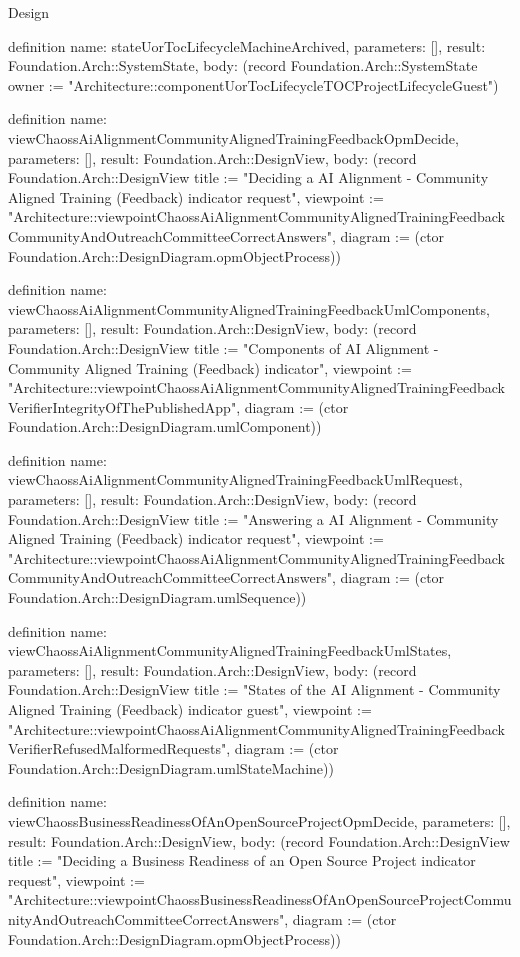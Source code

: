 \begin{lexlean}{Design}
\begin{semanticmodule}
definition{
  name: stateUorTocLifecycleMachineArchived,
  parameters: [],
  result: Foundation.Arch::SystemState,
  body: (record Foundation.Arch::SystemState {owner := "Architecture::componentUorTocLifecycleTOCProjectLifecycleGuest"})
}

definition{
  name: viewChaossAiAlignmentCommunityAlignedTrainingFeedbackOpmDecide,
  parameters: [],
  result: Foundation.Arch::DesignView,
  body: (record Foundation.Arch::DesignView {title := "Deciding a AI Alignment - Community Aligned Training (Feedback) indicator request", viewpoint := "Architecture::viewpointChaossAiAlignmentCommunityAlignedTrainingFeedbackCommunityAndOutreachCommitteeCorrectAnswers", diagram := (ctor Foundation.Arch::DesignDiagram.opmObjectProcess)})
}

definition{
  name: viewChaossAiAlignmentCommunityAlignedTrainingFeedbackUmlComponents,
  parameters: [],
  result: Foundation.Arch::DesignView,
  body: (record Foundation.Arch::DesignView {title := "Components of AI Alignment - Community Aligned Training (Feedback) indicator", viewpoint := "Architecture::viewpointChaossAiAlignmentCommunityAlignedTrainingFeedbackVerifierIntegrityOfThePublishedApp", diagram := (ctor Foundation.Arch::DesignDiagram.umlComponent)})
}

definition{
  name: viewChaossAiAlignmentCommunityAlignedTrainingFeedbackUmlRequest,
  parameters: [],
  result: Foundation.Arch::DesignView,
  body: (record Foundation.Arch::DesignView {title := "Answering a AI Alignment - Community Aligned Training (Feedback) indicator request", viewpoint := "Architecture::viewpointChaossAiAlignmentCommunityAlignedTrainingFeedbackCommunityAndOutreachCommitteeCorrectAnswers", diagram := (ctor Foundation.Arch::DesignDiagram.umlSequence)})
}

definition{
  name: viewChaossAiAlignmentCommunityAlignedTrainingFeedbackUmlStates,
  parameters: [],
  result: Foundation.Arch::DesignView,
  body: (record Foundation.Arch::DesignView {title := "States of the AI Alignment - Community Aligned Training (Feedback) indicator guest", viewpoint := "Architecture::viewpointChaossAiAlignmentCommunityAlignedTrainingFeedbackVerifierRefusedMalformedRequests", diagram := (ctor Foundation.Arch::DesignDiagram.umlStateMachine)})
}

definition{
  name: viewChaossBusinessReadinessOfAnOpenSourceProjectOpmDecide,
  parameters: [],
  result: Foundation.Arch::DesignView,
  body: (record Foundation.Arch::DesignView {title := "Deciding a Business Readiness of an Open Source Project indicator request", viewpoint := "Architecture::viewpointChaossBusinessReadinessOfAnOpenSourceProjectCommunityAndOutreachCommitteeCorrectAnswers", diagram := (ctor Foundation.Arch::DesignDiagram.opmObjectProcess)})
}


\end{semanticmodule}
\end{lexlean}
